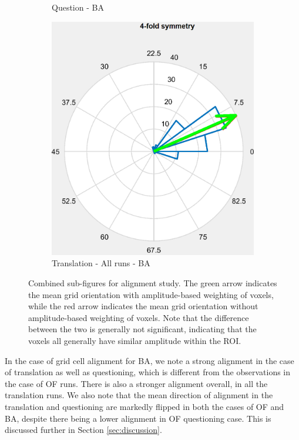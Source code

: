 \documentclass[a4paper]{article}
\begin{document}
\begin{figure}[h]
\begin{subfigure}[b]{0.3\textwidth}
        \caption{Question - BA}
        \label{fig:alignment_ques_BA}
    \end{subfigure}
    \hfill
    \begin{subfigure}[b]{0.3\textwidth}
        \includegraphics[width=\linewidth]{alignment_trans_ALL_BA.png}
        \caption{Translation - All runs - BA}
        \label{fig:alignment_trans_ALL_BA}
    \end{subfigure}

    \caption{Combined sub-figures for alignment study. The green arrow indicates the mean grid orientation with amplitude-based weighting of voxels, while the red arrow indicates the mean grid orientation without amplitude-based weighting of voxels. Note that the difference between the two is generally not significant, indicating that the voxels all generally have similar amplitude within the ROI.}
    \label{fig:combined_alignment}
\end{figure} 

In the case of grid cell alignment for BA, we note a strong alignment in the case of translation as well as questioning, which is different from the observations in the case of OF runs. There is also a stronger alignment overall, in all the translation runs. We also note that the mean direction of alignment in the translation and questioning are markedly flipped in both the cases of OF and BA, despite there being a lower alignment in OF questioning case. This is discussed further in Section \ref{sec:discussion}.
\end{document}
